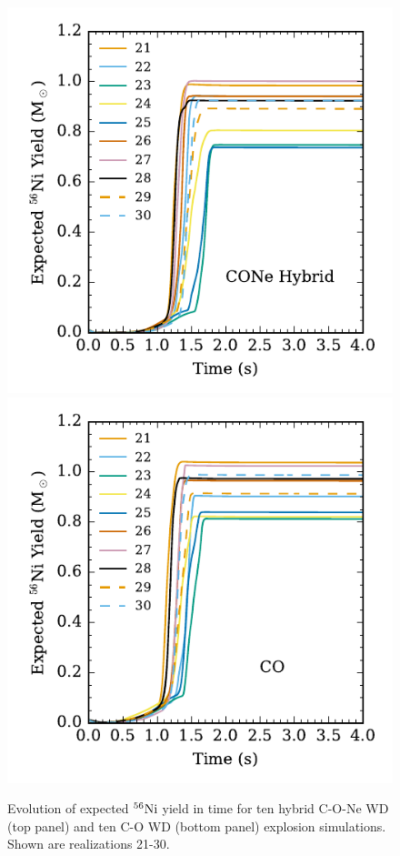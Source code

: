 \documentclass[preprint2]{aastex63}
\newcommand{\Ni}[1]{\ensuremath{{}^{#1}{\rm Ni}}}
\begin{document}
\begin{figure}
\includegraphics[width=\columnwidth]{figures/Hybrid_Ni56mass_v_time_plot.pdf}
\includegraphics[width=\columnwidth]{figures/CO_Ni56mass_v_time_plot.pdf}
	\caption{\label{fig:nithybrid} \label{fig:nitco}
Evolution of expected \Ni{56} yield in time for ten hybrid C-O-Ne WD (top panel) and ten C-O WD (bottom panel) explosion simulations.
Shown are realizations 21-30.
}
\end{figure}
\end{document}
